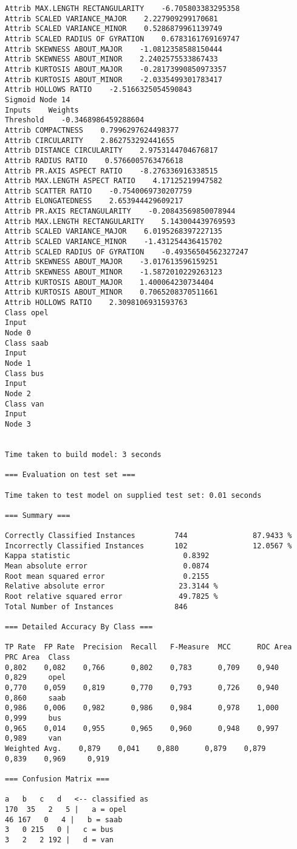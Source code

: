 \documentclass[
	article,			%
	11pt,				%
	oneside,			%
	a4paper,			%
	english,			%
	brazil,				%
	sumario=tradicional
	]{abntex2}
\begin{document}
\begin{lstlisting}
Attrib MAX.LENGTH RECTANGULARITY    -6.705803383295358
Attrib SCALED VARIANCE_MAJOR    2.227909299170681
Attrib SCALED VARIANCE_MINOR    0.5286879961139749
Attrib SCALED RADIUS OF GYRATION    0.6783161769169747
Attrib SKEWNESS ABOUT_MAJOR    -1.0812358588150444
Attrib SKEWNESS ABOUT_MINOR    2.2402575533867433
Attrib KURTOSIS ABOUT_MAJOR    -0.28173990850973357
Attrib KURTOSIS ABOUT_MINOR    -2.0335499301783417
Attrib HOLLOWS RATIO    -2.5166325054590843
Sigmoid Node 14
Inputs    Weights
Threshold    -0.3468986459288604
Attrib COMPACTNESS    0.7996297624498377
Attrib CIRCULARITY    2.862753292441655
Attrib DISTANCE CIRCULARITY    2.9753144704676817
Attrib RADIUS RATIO    0.5766005763476618
Attrib PR.AXIS ASPECT RATIO    -8.276336916338515
Attrib MAX.LENGTH ASPECT RATIO    4.17125219947582
Attrib SCATTER RATIO    -0.7540069730207759
Attrib ELONGATEDNESS    2.653944429609217
Attrib PR.AXIS RECTANGULARITY    -0.20843569850078944
Attrib MAX.LENGTH RECTANGULARITY    5.143004439769593
Attrib SCALED VARIANCE_MAJOR    6.0195268397227135
Attrib SCALED VARIANCE_MINOR    -1.431254436415702
Attrib SCALED RADIUS OF GYRATION    -0.49356504562327247
Attrib SKEWNESS ABOUT_MAJOR    -3.017613596159251
Attrib SKEWNESS ABOUT_MINOR    -1.5872010229263123
Attrib KURTOSIS ABOUT_MAJOR    1.400064230734404
Attrib KURTOSIS ABOUT_MINOR    0.7065208370511661
Attrib HOLLOWS RATIO    2.3098106931593763
Class opel
Input
Node 0
Class saab
Input
Node 1
Class bus
Input
Node 2
Class van
Input
Node 3


Time taken to build model: 3 seconds

=== Evaluation on test set ===

Time taken to test model on supplied test set: 0.01 seconds

=== Summary ===

Correctly Classified Instances         744               87.9433 %
Incorrectly Classified Instances       102               12.0567 %
Kappa statistic                          0.8392
Mean absolute error                      0.0874
Root mean squared error                  0.2155
Relative absolute error                 23.3144 %
Root relative squared error             49.7825 %
Total Number of Instances              846     

=== Detailed Accuracy By Class ===

TP Rate  FP Rate  Precision  Recall   F-Measure  MCC      ROC Area  PRC Area  Class
0,802    0,082    0,766      0,802    0,783      0,709    0,940     0,829     opel
0,770    0,059    0,819      0,770    0,793      0,726    0,940     0,860     saab
0,986    0,006    0,982      0,986    0,984      0,978    1,000     0,999     bus
0,965    0,014    0,955      0,965    0,960      0,948    0,997     0,989     van
Weighted Avg.    0,879    0,041    0,880      0,879    0,879      0,839    0,969     0,919     

=== Confusion Matrix ===

a   b   c   d   <-- classified as
170  35   2   5 |   a = opel
46 167   0   4 |   b = saab
3   0 215   0 |   c = bus
3   2   2 192 |   d = van


\end{lstlisting}
\end{document}
